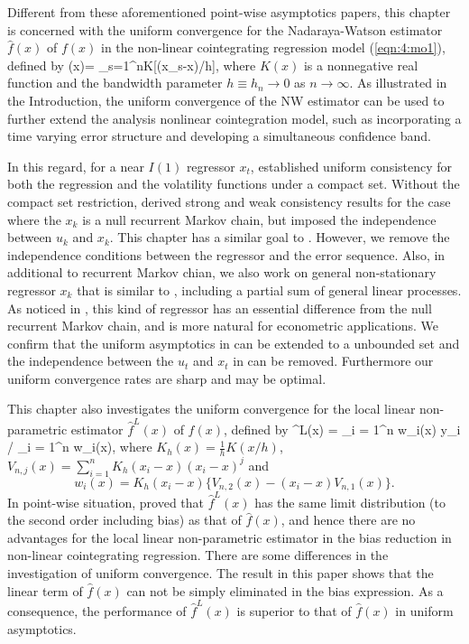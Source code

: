 Different from these aforementioned point-wise asymptotics papers, this chapter is concerned with the uniform convergence for the Nadaraya-Watson estimator $\widehat{f}(x)$ of $f(x)$ in the non-linear cointegrating
regression model (\ref {eqn:4:mo1}), defined by
\be {}(x)=
{\sum_{s=1}^{n}K[(x_{s}-x)/h]},
\ee
where $K(x)$ is a nonnegative real function and  the bandwidth parameter $h\equiv h_n\to 0$ as $n\to\infty$. As illustrated in the Introduction, the uniform convergence of the NW estimator can be used to further extend the analysis nonlinear cointegration model, such as incorporating a time varying error structure and developing a simultaneous confidence band.

In this regard, for a near $I(1)$ regressor $x_t$, \cite{wangwang2012} established uniform consistency for  both the regression and the volatility functions under  a compact set. Without the compact set restriction,  \cite{gaolitjostheim2011} derived strong and weak consistency results for the case where the $x_k$ is a null recurrent Markov chain,  but  imposed the independence between $u_k$ and $x_k$. This chapter has a similar goal to \cite{gaolitjostheim2011}. However, we remove the independence conditions between the regressor and the error sequence. Also, in additional to recurrent Markov chian, we also work on general non-stationary regressor $x_k$ that is similar to \cite{wangphillips2010a}, including a partial sum of general linear processes. As noticed in \cite{wangphillips2010a}, this kind of regressor has an essential difference from the null recurrent Markov chain, and is more natural for econometric applications.  We confirm that the uniform asymptotics in \cite{wangwang2012} can be extended to a unbounded set and the independence between the $u_t$ and $x_t$ in \cite{gaolitjostheim2011} can be removed. Furthermore  our uniform convergence rates are sharp and may be optimal.

This chapter also investigates the uniform convergence for the local linear non-parametric estimator $\widehat{f}^L(x)$ of $f(x)$, defined by
\be {}
^L(x) = \sum_{i = 1}^n w_i(x) y_i / \sum_{i = 1}^n w_i(x), \quad
\ee
where $K_h(x) = \frac{1}{h}K(x/h)$, $V_{n, j}(x) =  \sum_{i=1}^n K_h(x_i - x) (x_i - x)^j$
and
$$
w_i(x) = K_h(x_i - x) \{ V_{n,2}(x) - (x_i - x) V_{n,1}(x) \}.
$$
 In point-wise situation, \cite{wangphillips2010b} proved that $\widehat{f}^L(x)$ has the same limit distribution (to the second order including bias) as that of   $\widehat{f}(x)$, and hence there are no advantages  for  the local linear non-parametric  estimator in the bias reduction in non-linear cointegrating regression. There are some differences in the investigation of  uniform convergence. The result in this paper shows that the linear term  of $\widehat{f}(x)$ can not be simply eliminated in the bias expression. As a consequence,   the performance of $\widehat{f}^L(x)$ is superior to that of $\widehat{f}(x)$ in uniform asymptotics. 

